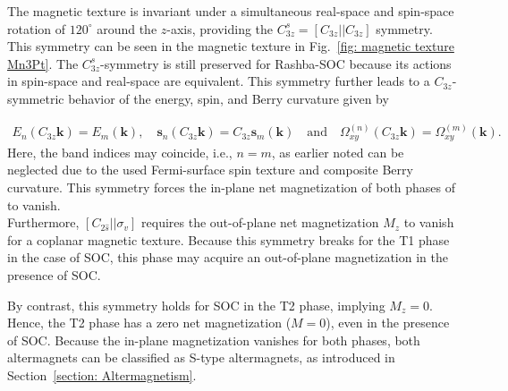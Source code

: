 The magnetic texture is invariant under a simultaneous real-space and spin-space rotation of $120^\circ$ around the $z$-axis, providing the $C_{3z}^s =[C_{3z}||C_{3z}]$ symmetry. This symmetry can be seen in the magnetic texture in Fig.~\ref{fig: magnetic texture Mn3Pt}.
The $C_{3z}^s$-symmetry is still preserved for Rashba-SOC because its actions in spin-space and real-space are equivalent. 
This symmetry further leads to a $C_{3z}$-symmetric behavior of the energy, spin, and Berry curvature given by 

\begin{align}
    E_n(C_{3z}\mathbf k)=E_m(\mathbf k), \quad
    \mathbf s_n(C_{3z}\mathbf k)
  =C_{3z}\mathbf s_m(\mathbf k) \quad \text{and} \quad
    \Omega_{xy}^{(n)}(C_{3z}\mathbf k)
  =\Omega_{xy}^{(m)}(\mathbf k). 
    \label{eq: C_3z^s symm}
\end{align}
Here, the band indices may coincide, i.e., $n=m$, as earlier noted can be neglected due to the used Fermi-surface spin texture and composite Berry curvature. This symmetry forces the in-plane net magnetization of both phases of  to vanish. \\
Furthermore, $[C_{2\hat{s}}||\sigma_v]$ requires the out-of-plane net magnetization $M_z$ to vanish for a coplanar magnetic texture. Because this symmetry breaks for the T1 phase in the case of SOC, this phase may acquire an out-of-plane magnetization in the presence of SOC. 

By contrast, this symmetry holds for SOC in the T2 phase, implying $M_z=0$. Hence, the T2 phase has a zero net magnetization ($M=0$), even in the presence of SOC. Because the in-plane magnetization vanishes for both phases, both altermagnets can be classified as S-type altermagnets, as introduced in Section~\ref{section: Altermagnetism}. 

